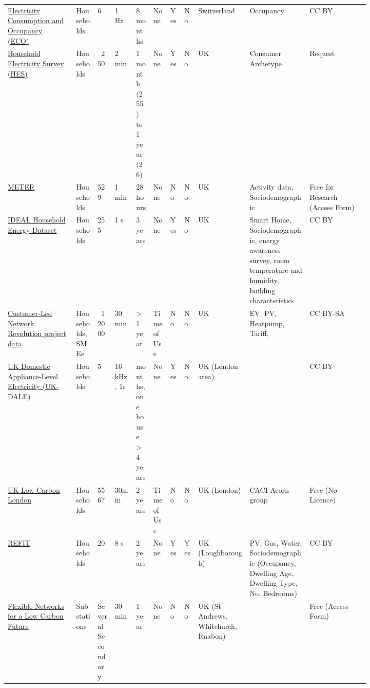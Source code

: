 \begin{sidewaystable*}
{\begin{tabular}{p{0.16\linewidth}p{0.05\linewidth}p{0.04\linewidth}p{0.05\linewidth}p{0.04\linewidth}p{0.04\linewidth}p{0.02\linewidth}p{0.02\linewidth}p{0.12\linewidth}p{0.14\linewidth}p{0.14\linewidth}}
			\href{http://www.vs.inf.ethz.ch/res/show.html?what=eco-data}{Electricity Consumption and Occupancy (ECO)}~\cite{Christian2014ted, Wilhelm2015hom} & Households & 6     & 1 Hz  & 8 months & None  & Yes   & No    & Switzerland & Occupancy & CC BY \\
			\href{https://www.gov.uk/government/publications/household-electricity-survey--2}{Household Electricity Survey (HES)}~\cite{Zimmermann2012hes} & Households & ~{}250 & 2 min & 1 month (255) to 1 year (26) & None  & Yes   & No    & UK    & Consumer Archetype & Request \\
			\href{https://beta.ukdataservice.ac.uk/datacatalogue/studies/study?id=8634}{METER}~\cite{Grunewald2019muh} & Households & 529   & 1 min & 28 hours & None  & No    & No    & UK    & Activity data, Sociodemographic & Free for Research (Access Form) \\
			\href{https://datashare.ed.ac.uk/handle/10283/3647}{IDEAL Household Energy Dataset}~\cite{goddard2020ihe}
			& Households & 255   & 1 s     & 3 years & None  & Yes   & No    & UK    & Smart Home, Sociodemographic, energy awareness survey, room temperature and humidity, building characteristics & CC BY \\
			\href{http://www.networkrevolution.co.uk/resources/project-data/}{Customer-Led Network Revolution project data}~\cite{sidebotham2015cln} & Households, SMEs & ~{}12000 & 30 min & > 1 year & Time of Use & No    & No    & UK    & EV, PV, Heatpump, Tariff,  & CC BY-SA \\
			\href{https://jack-kelly.com/data/}{UK Domestic Appliance-Level Electricity (UK-DALE)}~\cite{Jack2015tud} & Households & 5     & 16 kHz, 1s & months, one house > 4 years & None  & Yes   & No    & UK (London area) &       & CC BY \\
			\href{https://data.london.gov.uk/dataset/smartmeter-energy-use-data-in-london-households}{UK Low Carbon London}~\cite{UK2014ulc,Godahewa2021lsm} & Households & 5567  & 30min & 2 years & Time of Use & No    &  No   & UK (London) & CACI Acorn group & Free (No Licence) \\
			\href{https://www.refitsmarthomes.org/datasets/}{REFIT}~\cite{Murray2016rel, Murray2017ael} & Households & 20    & 8 s   & 2 years & None  & Yes   & Yes   & UK (Loughborough) & PV, Gas, Water, Sociodemographic (Occupancy, Dwelling Age, Dwelling Type, No. Bedrooms) & CC BY \\
			\href{https://www.spenergynetworks.co.uk/pages/flexible_network_data_share.aspx}{Flexible Networks for a Low Carbon Future} & Substations & Several Secondary  & 30 min & 1 year & None  & No    & No    & UK (St Andrews, Whitchurch, Ruabon) &       & Free (Access Form) \\

\end{tabular}}
\end{sidewaystable*}
